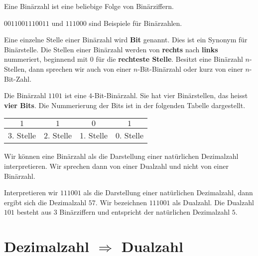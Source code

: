 \begin{definition}[Binärzahl]
Eine Binärzahl ist eine beliebige Folge von Binärziffern.
\end{definition}

\begin{example}
$0011001110011$ und $111000$ sind Beispiele für Binärzahlen.
\end{example}

\begin{definition}[Bit]
Eine einzelne Stelle einer Binärzahl wird \textbf{Bit} genannt. Dies ist ein Synonym für Binärstelle. Die Stellen einer Binärzahl werden von \textbf{rechts} nach \textbf{links} nummeriert, beginnend mit $0$ für die \textbf{rechteste Stelle}. Besitzt eine Binärzahl $n$-Stellen, dann sprechen wir auch von einer $n$-Bit-Binärzahl oder kurz von einer $n$-Bit-Zahl.
\end{definition}

\begin{example}
Die Binärzahl $1101$ ist eine $4$-Bit-Binärzahl. Sie hat vier Binärstellen, das heisst \textbf{vier Bits}. Die Nummerierung der Bits ist in der folgenden Tabelle dargestellt.

\begin{table}[H]
\centering
\begin{tabular}{|c|c|c|c|}
\hline
$1$         & $1$         & $0$         & $1$         \\ \hline
3. Stelle & 2. Stelle & 1. Stelle & 0. Stelle \\ \hline
\end{tabular}
\end{table}
\end{example}

\begin{definition}[Dualzahlen]
Wir können eine Binärzahl als die Darstellung einer natürlichen Dezimalzahl interpretieren. Wir sprechen dann von einer Dualzahl und nicht von einer Binärzahl.
\end{definition}

\begin{example}
Interpretieren wir $111001$ als die Darstellung einer natürlichen Dezimalzahl, dann ergibt sich die Dezimalzahl $57$. Wir bezeichnen $111001$ als Dualzahl. Die Dualzahl $101$ besteht aus $3$ Binärziffern und entspricht der natürlichen Dezimalzahl $5$.
\end{example}

\section{Dezimalzahl $\Rightarrow$ Dualzahl}

